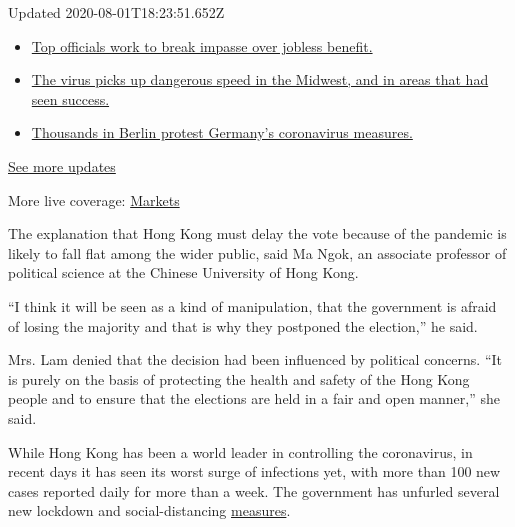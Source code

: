 Updated 2020-08-01T18:23:51.652Z

\begin{itemize}
\tightlist
\item
  \href{https://www.nytimes.com/2020/08/01/world/coronavirus-covid-19.html?action=click\&pgtype=Article\&state=default\&region=MAIN_CONTENT_1\&context=storylines_live_updates\#link-3ac56579}{Top
  officials work to break impasse over jobless benefit.}
\item
  \href{https://www.nytimes.com/2020/08/01/world/coronavirus-covid-19.html?action=click\&pgtype=Article\&state=default\&region=MAIN_CONTENT_1\&context=storylines_live_updates\#link-8796723}{The
  virus picks up dangerous speed in the Midwest, and in areas that had
  seen success.}
\item
  \href{https://www.nytimes.com/2020/08/01/world/coronavirus-covid-19.html?action=click\&pgtype=Article\&state=default\&region=MAIN_CONTENT_1\&context=storylines_live_updates\#link-25930521}{Thousands
  in Berlin protest Germany's coronavirus measures.}
\end{itemize}

\href{https://www.nytimes.com/2020/08/01/world/coronavirus-covid-19.html?action=click\&pgtype=Article\&state=default\&region=MAIN_CONTENT_1\&context=storylines_live_updates}{See
more updates}

More live coverage:
\href{https://www.nytimes.com/live/2020/07/31/business/stock-market-today-coronavirus?action=click\&pgtype=Article\&state=default\&region=MAIN_CONTENT_1\&context=storylines_live_updates}{Markets}

The explanation that Hong Kong must delay the vote because of the
pandemic is likely to fall flat among the wider public, said Ma Ngok, an
associate professor of political science at the Chinese University of
Hong Kong.

``I think it will be seen as a kind of manipulation, that the government
is afraid of losing the majority and that is why they postponed the
election,'' he said.

Mrs. Lam denied that the decision had been influenced by political
concerns. ``It is purely on the basis of protecting the health and
safety of the Hong Kong people and to ensure that the elections are held
in a fair and open manner,'' she said.

While Hong Kong has been a world leader in controlling the coronavirus,
in recent days it has seen its worst surge of infections yet, with more
than 100 new cases reported daily for more than a week. The government
has unfurled several new lockdown and social-distancing
\href{https://www.nytimes.com/2020/07/31/world/asia/hongkong-dining-lunch-coronavirus.html}{measures}.

